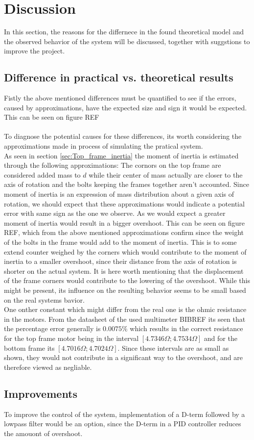 \documentclass[../../main]{subfiles}
\begin{document}
\section{Discussion}
\label{sec:discussion}
In this section, the reasons for the differnece in the found theoretical model and the observed behavior of the system will be discussed, together with suggstions to improve the project.
\subsection{Difference in practical vs. theoretical results}
Fistly the above mentioned differences must be quantified to see if the errors, caused by approximations, have the expected size and sign it would be expected. This can be seen on figure REF\\
\\
To diagnose the potential causes for these differences, its worth considering the approximations made in process of simulating the pratical system.\\
As seen in section \ref{sec:Top_frame_inertia} the moment of inertia is estimated through the following approximations: The cornors on the top frame are considered added mass to $d$ while their center of mass actually are closer to the axis of rotation and the bolts keeping the frames together aren't accounted. Since moment of inertia is an expression of mass distribution about a given axis of rotation, we should expect that these approximations would indicate a potential error with same sign as the one we observe. As we would expect a greater moment of inertia would result in a bigger overshoot. This can be seen on figure REF, which from the above mentioned approximations confirm since the weight of the bolts in the frame would add to the moment of inertia. This is to some extend counter weighed by the corners which would contribute to the moment of inertia to a smaller overshoot, since their distance from the axis of rotation is shorter on the actual system. It is here worth mentioning that the displacement of the frame corners would contribute to the lowering of the overshoot. While this might be present, its influence on the resulting behavior seems to be small based on the real systems bavior.\\
One onther constant which might differ from the real one is the ohmic resistance in the motors. From the datasheet of the used multimeter BIBREF its seen that the percentage error generally is $0.0075\%$ which results in the correct resistance for the top frame motor being in the interval $[4.7346\Omega;4.7534\Omega]$ and for the bottom frame its $[4.7016\Omega;4.7024\Omega]$. Since these intervals are as small as shown, they would not contribute in a significant way to the overshoot, and are therefore viewed as negliable.\\
\subsection{Improvements}
To improve the control of the system, implementation of a D-term followed by a lowpass filter would be an option, since the D-term in a PID controller reduces the amouont of overshoot.
\end{document}

